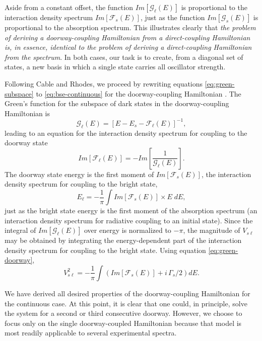 \documentclass[12pt]{mitthesis}
\begin{document}
Aside from a constant offset, the function $Im[\mathcal{G}_{\ell}(E)]$
is proportional to the interaction density spectrum
$Im[\mathcal{F}_s(E)]$, just as the function $Im[\mathcal{G}_s(E)]$ is
proportional to the absorption spectrum.  This illustrates clearly
that \emph{the problem of deriving a doorway-coupling Hamiltonian from
  a direct-coupling Hamiltonian is, in essence, identical to the
  problem of deriving a direct-coupling Hamiltonian from the
  spectrum}.  In both cases, our task is to create, from a diagonal
set of states, a new basis in which a single state carries all
oscillator strength.

Following Cable and Rhodes, we proceed by rewriting equations
\ref{eq:green-subspace} to \ref{eq:bse-continuous} for the
doorway-coupling Hamiltonian \cite{cable80}.  The Green's function for
the subspace of dark states in the doorway-coupling Hamiltonian is
\begin{equation}
  \label{eq:green-doorway-subspace}
  \mathcal{G}_{\ell}(E) = [E - E_s - \mathcal{F}_{\ell}(E)]^{-1},
\end{equation}
leading to an equation for the interaction density spectrum for
coupling to the doorway state
\begin{equation}
  \label{eq:idf}
  Im[\mathcal{F}_{\ell}(E)] = - Im \left [
    \frac{1}{\mathcal{G}_{\ell}(E)}
  \right ].
\end{equation}
The doorway state energy is the first moment of
$Im[\mathcal{F}_{s}(E)]$, the interaction density spectrum for
coupling to the bright state,
\begin{equation}
  \label{eq:dse-continuous}
  E_{\ell} = - \frac{1}{\pi} \int Im[\mathcal{F}_s(E)] \times E \; dE,
\end{equation}
just as the bright state energy is the first moment of the absorption
spectrum (an interaction density spectrum for radiative coupling to an
initial state).  Since the integral of $Im[\mathcal{G}_{\ell}(E)]$
over energy is normalized to $-\pi$, the magnitude of $V_{s\ell}$ may
be obtained by integrating the energy-dependent part of the interaction
density spectrum for coupling to the bright state.  Using equation
\ref{eq:green-doorway},
\begin{equation}
  V_{s\ell}^2 = -\frac{1}{\pi} \int \left (
    Im[\mathcal{F}_s(E)] + i \, \Gamma_s / 2
  \right ) dE.
\end{equation}

We have derived all desired properties of the doorway-coupling
Hamiltonian for the continuous case.  At this point, it is clear that
one could, in principle, solve the system for a second or third
consecutive doorway.  However, we choose to focus only on the single
doorway-coupled Hamiltonian because that model is most readily
applicable to several experimental spectra.
\end{document}
